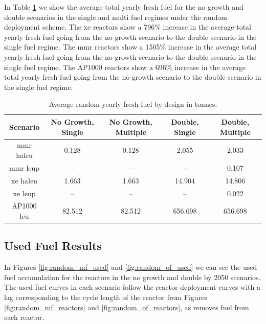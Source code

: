 In Table \ref{tab:random_fresh_avg} we show the average total yearly fresh fuel for the no growth and double scenarios in the single and multi fuel regimes under the random deployment scheme. The \gls{xe} reactors show a 796\% increase in the average total yearly fresh fuel going from the no growth scenario to the double scenario in the single fuel regime. The \gls{mmr} reactors show a 1505\% increase in the average total yearly fresh fuel going from the no growth scenario to the double scenario in the single fuel regime. The AP1000 reactors show a 696\% increase in the average total yearly fresh fuel going from the no growth scenario to the double scenario in the single fuel regime.

\begin{table}[H]
    \centering
    \caption{Average random yearly fresh fuel by design in tonnes.}
    \label{tab:random_fresh_avg}
    \begin{tabular}{c c c c c}
       \hline
       Scenario & No Growth, Single & No Growth, Multiple & Double, Single & Double, Multiple  \\
       \hline
       \gls{mmr} \gls{haleu}   & 0.128    & 0.128   & 2.055    & 2.033    \\
       \gls{mmr} \gls{leup}    & --       & --      & --       & 0.107    \\
       \gls{xe} \gls{haleu}    & 1.663    & 1.663   & 14.904   & 14.806   \\
       \gls{xe} \gls{leup}     & --       & --      & --       & 0.022    \\
       AP1000 \gls{leu}        & 82.512   & 82.512  & 656.698  & 656.698  \\
       \hline
    \end{tabular}
\end{table}





\subsection{Used Fuel Results}
\label{sec:random_used}

In Figures \ref{fig:random_mf_used} and \ref{fig:random_of_used} we can see the used fuel accumulation for the reactors in the no growth and double by 2050 scenarios. The used fuel curves in each scenario follow the reactor deployment curves with a lag corresponding to the cycle length of the reactor from Figures \ref{fig:random_mf_reactors} and \ref{fig:random_of_reactors}, as \cyclus removes fuel from each reactor.


